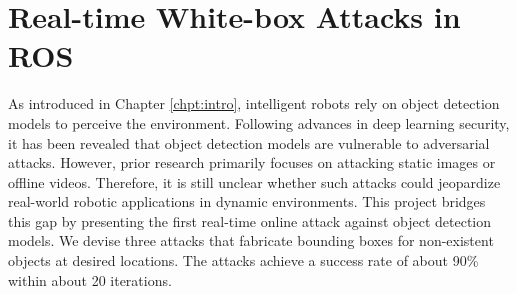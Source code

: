 



\section{Real-time White-box Attacks in ROS}
\label{sec:adv_detect}

As introduced in Chapter \ref{chpt:intro}, intelligent robots rely on object detection models to perceive the environment. Following advances in deep learning security, it has been revealed that object detection models are vulnerable to adversarial attacks. However, prior research primarily focuses on attacking static images or offline videos. Therefore, it is still unclear whether such attacks could jeopardize real-world robotic applications in dynamic environments. This project bridges this gap by presenting the first real-time online attack against object detection models. We devise three attacks that fabricate bounding boxes for non-existent objects at desired locations. The attacks achieve a success rate of about 90\% within about 20 iterations. 



